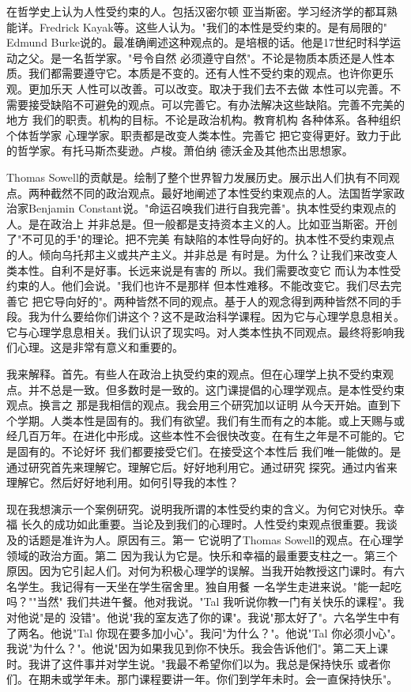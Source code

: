 在哲学史上认为人性受约束的人。包括汉密尔顿 亚当斯密。学习经济学的都耳熟能详。Fredrick Kayak等。这些人认为。"我们的本性是受约束的。是有局限的" Edmund Burke说的。最准确阐述这种观点的。是培根的话。他是17世纪时科学运动之父。是一名哲学家。"号令自然 必须遵守自然"。不论是物质本质还是人性本质。我们都需要遵守它。本质是不变的。还有人性不受约束的观点。也许你更乐观。更加乐天 人性可以改善。可以改变。取决于我们去不去做 本性可以完善。不需要接受缺陷不可避免的观点。可以完善它。有办法解决这些缺陷。完善不完美的地方 我们的职责。机构的目标。不论是政治机构。教育机构 各种体系。各种组织 个体哲学家 心理学家。职责都是改变人类本性。完善它 把它变得更好。致力于此的哲学家。有托马斯杰斐逊。卢梭。萧伯纳 德沃金及其他杰出思想家。 

Thomas Sowell的贡献是。绘制了整个世界智力发展历史。展示出人们执有不同观点。两种截然不同的政治观点。最好地阐述了本性受约束观点的人。法国哲学家政治家Benjamin Constant说。"命运召唤我们进行自我完善"。执本性受约束观点的人。是在政治上 并非总是。但一般都是支持资本主义的人。比如亚当斯密。开创了"不可见的手"的理论。把不完美 有缺陷的本性导向好的。执本性不受约束观点的人。倾向乌托邦主义或共产主义。并非总是 有时是。为什么？让我们来改变人类本性。自利不是好事。长远来说是有害的 所以。我们需要改变它 而认为本性受约束的人。他们会说。"我们也许不是那样 但本性难移。不能改变它。我们尽去完善它 把它导向好的"。两种皆然不同的观点。基于人的观念得到两种皆然不同的手段。我为什么要给你们讲这个？这不是政治科学课程。因为它与心理学息息相关。它与心理学息息相关。我们认识了现实吗。对人类本性执不同观点。最终将影响我们心理。这是非常有意义和重要的。 

我来解释。首先。有些人在政治上执受约束的观点。但在心理学上执不受约束观点。并不总是一致。但多数时是一致的。这门课提倡的心理学观点。是本性受约束观点。换言之 那是我相信的观点。我会用三个研究加以证明 从今天开始。直到下个学期。人类本性是固有的。我们有欲望。我们有生而有之的本能。或上天赐与或经几百万年。在进化中形成。这些本性不会很快改变。在有生之年是不可能的。它是固有的。不论好坏 我们都要接受它们。在接受这个本性后 我们唯一能做的。是通过研究首先来理解它。理解它后。好好地利用它。通过研究 探究。通过内省来理解它。然后好好地利用。如何引导我的本性？ 

现在我想演示一个案例研究。说明我所谓的本性受约束的含义。为何它对快乐。幸福 长久的成功如此重要。当论及到我们的心理时。人性受约束观点很重要。我谈及的话题是准许为人。原因有三。第一 它说明了Thomas Sowell的观点。在心理学领域的政治方面。第二 因为我认为它是。快乐和幸福的最重要支柱之一。第三个原因。因为它引起人们。对何为积极心理学的误解。当我开始教授这门课时。有六名学生。我记得有一天坐在学生宿舍里。独自用餐 一名学生走进来说。"能一起吃吗？""当然" 我们共进午餐。他对我说。"Tal 我听说你教一门有关快乐的课程"。我对他说"是的 没错"。他说"我的室友选了你的课"。我说"那太好了"。六名学生中有了两名。他说"Tal 你现在要多加小心"。我问"为什么？"。他说"Tal 你必须小心"。我说"为什么？"。他说"因为如果我见到你不快乐。我会告诉他们"。第二天上课时。我讲了这件事并对学生说。"我最不希望你们以为。我总是保持快乐 或者你们。在期未或学年未。那门课程要讲一年。你们到学年未时。会一直保持快乐"。 


